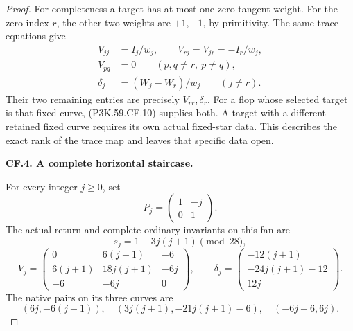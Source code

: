 \begin{proof}
For completeness a target has at most one zero tangent weight.
For the zero index \(r\), the other two weights are \(+1,-1\),
by primitivity. The same trace equations give
\[
 \begin{aligned}
 V_{jj}&=I_j/w_j,\qquad V_{rj}=V_{jr}=-I_r/w_j,\\
 V_{pq}&=0\qquad(p,q\ne r,\ p\ne q),\\
 \delta_j&=(W_j-W_r)/w_j\qquad(j\ne r).
 \end{aligned}                                      \tag{P3K.59.CF.13}
\]
Their two remaining entries are precisely \(V_{rr},\delta_r\).
For a flop whose selected target is that fixed curve, (P3K.59.CF.10)
supplies both. A target with a different retained fixed curve
requires its own actual fixed-star data. This describes the
exact rank of the trace map and leaves that specific data open.

\par\medskip\noindent\textbf{CF.4. A complete horizontal staircase.}\par\nopagebreak[4]

For every integer \(j\ge0\), set
\[
 P_j=\begin{pmatrix}1&-j\\0&1\end{pmatrix}.             \tag{P3K.59.CF.14}
\]
The actual return and complete ordinary invariants on this fan are
\[
 s_j=1-3j(j+1)\pmod {28},
\]
\[
 V_j=\begin{pmatrix}
 0&6(j+1)&-6\\
 6(j+1)&18j(j+1)&-6j\\
 -6&-6j&0
 \end{pmatrix},\qquad
 \delta_j=\begin{pmatrix}
 -12(j+1)\\-24j(j+1)-12\\12j
 \end{pmatrix}.                                      \tag{P3K.59.CF.15}
\]
The native pairs on its three curves are
\[
 (6j,-6(j+1)),\quad
 (3j(j+1),-21j(j+1)-6),\quad
 (-6j-6,6j).                                         \tag{P3K.59.CF.16}
\]


\end{proof}
